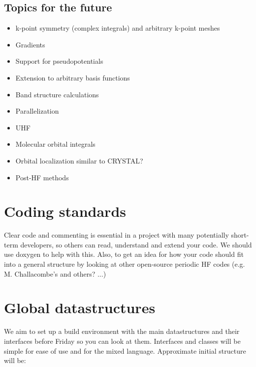 \documentclass{report}
\begin{document}
\subsection{Topics for the future}

\begin{itemize}
\item k-point symmetry (complex integrals) and arbitrary k-point meshes
\item Gradients
\item Support for pseudopotentials
\item Extension to arbitrary basis functions
\item Band structure calculations
\item Parallelization
\item UHF
\item Molecular orbital integrals
\item Orbital localization similar to CRYSTAL?
\item Post-HF methods
\end{itemize}


\section{Coding standards}

Clear code and commenting is essential in a project with many potentially short-term developers, so others can read, understand and extend your code.
We should use doxygen to help with this. Also, to get an idea for how your code should fit into a general structure by looking at other open-source
periodic HF codes (e.g. M. Challacombe's and others? ...)

\section{Global datastructures}

We aim to set up a build environment with the main datastructures and their interfaces before Friday so you can look at them. Interfaces and classes will be simple
for ease of use and for the mixed language. Approximate initial structure will be:
\end{document}

